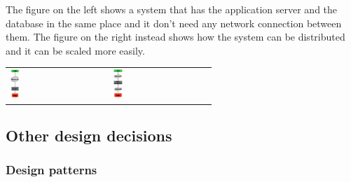 	The figure on the left shows a system that has the application server and the database in the same place and it don't need any network connection between them. The figure on the right instead shows how the system can be distributed and it can be scaled more easily.
	\begin{center}
		\begin{tabular}{>{\centering}m{5cm}|>{\centering}m{5cm}}
			\includegraphics[width=0.10\textwidth]{./images/architecture1.png} & 	
			\includegraphics[width=0.10\textwidth]{./images/architecture2.png}  \\ 
		\end{tabular} 
	\end{center}	  	
\subsection{Other design decisions}
	\subsubsection{Design patterns}